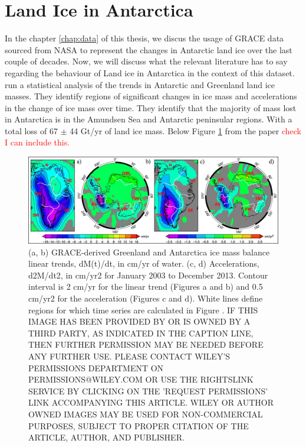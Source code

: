\documentclass[../main.tex]{subfiles}
\begin{document}
\section{Land Ice in Antarctica}
In the chapter \ref{chap:data} of this thesis, we discus the usage of GRACE data sourced from NASA to represent the changes in Antarctic land ice over the last couple of decades. Now, we will discuss what the relevant literature has to say regarding the behaviour of Land ice in Antarctica in the context of this dataset. \cite{Velicogna2014RegionalData} run a statistical analysis of the trends in Antarctic and Greenland land ice masses. They identify regions of significant changes in ice mass and accelerations in the change of ice mass over time. They identify that the majority of mass lost in Antarctica is in the Amundsen Sea and Antarctic peninsular regions. With a total loss of 67 $\pm$ 44 Gt/yr of land ice mass. Below Figure \ref{fig:ice_mass_from_paper} from the paper \textcolor{red}{check I can include this.}
\begin{figure}[hbt!]
    \centering
    \includegraphics[width=\textwidth]{images/from_papers/grl52143-fig-0001-m.jpg}
    \caption{(a, b) GRACE‐derived Greenland and Antarctica ice mass balance linear trends, dM(t)/dt, in cm/yr of water. (c, d) Accelerations, d2M/dt2, in cm/yr2 for January 2003 to December 2013. Contour interval is 2 cm/yr for the linear trend (Figures a and b) and 0.5 cm/yr2 for the acceleration (Figures c and d). White lines define regions for which time series are calculated in Figure .
IF THIS IMAGE HAS BEEN PROVIDED BY OR IS OWNED BY A THIRD PARTY, AS INDICATED IN THE CAPTION LINE, THEN FURTHER PERMISSION MAY BE NEEDED BEFORE ANY FURTHER USE. PLEASE CONTACT WILEY'S PERMISSIONS DEPARTMENT ON PERMISSIONS@WILEY.COM OR USE THE RIGHTSLINK SERVICE BY CLICKING ON THE 'REQUEST PERMISSIONS' LINK ACCOMPANYING THIS ARTICLE. WILEY OR AUTHOR OWNED IMAGES MAY BE USED FOR NON-COMMERCIAL PURPOSES, SUBJECT TO PROPER CITATION OF THE ARTICLE, AUTHOR, AND PUBLISHER. 
}
    \label{fig:ice_mass_from_paper}
\end{figure}
\end{document}
